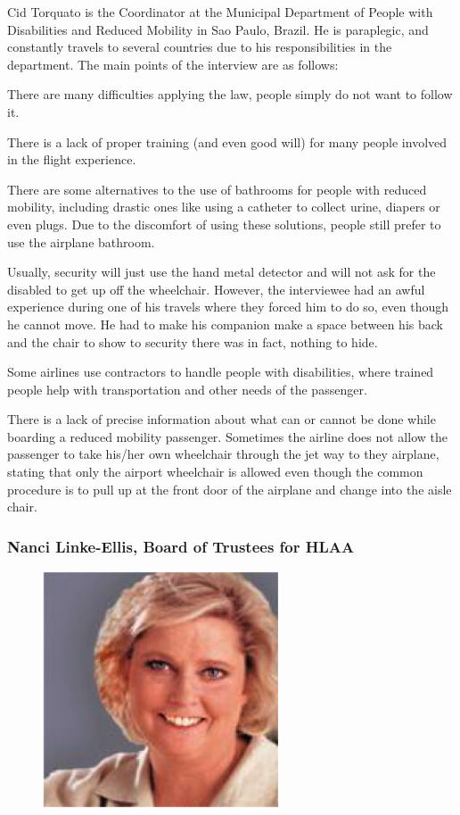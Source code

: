 \documentclass[a4paper, 12pt,conference]{new_cit_thesis}
\begin{document}
Cid Torquato is the Coordinator at the Municipal Department of People with Disabilities and Reduced Mobility in Sao Paulo, Brazil. He is paraplegic, and constantly travels to several countries due to his responsibilities in the department. The main points of the interview are as follows:

\begin{list}{-}{}
  \item There are many difficulties applying the law, people simply do not want to follow it.
  \item There is a lack of proper training (and even good will) for many people involved in the flight experience.
  \item There are some alternatives to the use of bathrooms for people with reduced mobility, including drastic ones like using a catheter to collect urine, diapers or even plugs. Due to the discomfort of using these solutions, people still prefer to use the airplane bathroom.
  \item Usually, security will just use the hand metal detector and will not ask for the disabled to get up off the wheelchair. However, the interviewee had an awful experience during one of his travels where they forced him to do so, even though he cannot move. He had to make his companion make a space between his back and the chair to show to security there was in fact, nothing to hide.
  \item Some airlines use contractors to handle people with disabilities, where trained people help with transportation and other needs of the passenger.
  \item There is a lack of precise information about what can or cannot be done while boarding a reduced mobility passenger. Sometimes the airline does not allow the passenger to take his/her own wheelchair through the jet way to they airplane, stating that only the airport wheelchair is allowed even though the common procedure is to pull up at the front door of the airplane and change into the aisle chair. 
\end{list}

\subsubsection{Nanci Linke-Ellis, Board of Trustees for HLAA}

\begin{figure}[h]
  \centering
     \includegraphics[width=7cm]{images/image027}
  \label{fig:27}
\end{figure}
\end{document}
